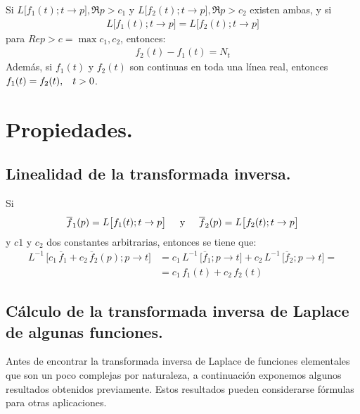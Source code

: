 \noindent Si $L \big[ f_{1} (t); t \to p \big], \Re {p} > c_{1}$ y $L \big[ f_{2} (t); t \to p \big], \Re {p} > c_{2}$ existen ambas, y si
\begin{align*}
L \big[ f_{1} (t); t \to p \big] = L \big[ f_{2} (t); t \to p \big]
\end{align*}
para $Re{p} > c = \max{c_{1},c_{2}}$, entonces:
\begin{align*}
f_{2} (t) - f_{1} (t) = N_{t}
\end{align*}
Además, si $f_{1} (t)$ y $f_{2} (t)$ son continuas en toda una línea real, entonces $f_{1} (t) = f_{2} (t), \hspace{0.3cm} t > 0$.
\section{Propiedades.}

\subsection{Linealidad de la transformada inversa.}

Si
\begin{align*}
\overline{f}_{1} (p) = L \big[ f_{1} (t); t \to p \big] \hspace{0.5cm} \mbox{y} \hspace{0.5cm} \overline{f}_{2} (p) = L \big[ f_{2} (t); t \to p \big]
\end{align*}
y $c{1}$ y $c_{2}$ dos constantes arbitrarias, entonces se tiene que:
\begin{align*}
L^{-1} \, \big[  c_{1} \, \overline{f}_{1} + c_{2} \, \overline{f}_{2} (p); p \to t \big] &= c_{1} \, L^{-1} \, \big[  \overline{f}_{1}; p \to t \big] + c_{2} \, L^{-1} \, \big[  \overline{f}_{2}; p \to t \big] = \\[0.5em]
&= c_{1} \, f_{1} (t) + c_{2} \, f_{2} (t)
\end{align*}

\subsection{Cálculo de la transformada inversa de Laplace de algunas funciones.}

Antes de encontrar la transformada inversa de Laplace de funciones elementales que son un poco complejas por naturaleza, a continuación exponemos algunos resultados obtenidos previamente. Estos resultados pueden considerarse fórmulas para otras aplicaciones.

